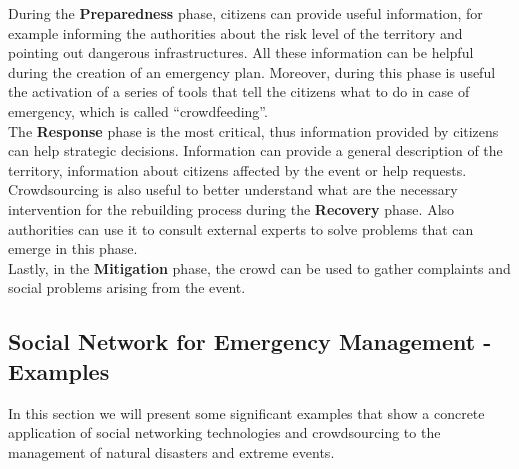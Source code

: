\noindent During the \textbf{Preparedness} phase, citizens can provide useful information, for example informing the authorities about the risk level of the territory and pointing out dangerous infrastructures. All these information can be helpful during the creation of an emergency plan. Moreover, during this phase is useful the activation of a series of tools that tell the citizens what to do in case of emergency, which is called ``crowdfeeding''.
\\
\noindent The \textbf{Response} phase is the most critical, thus information provided by citizens can help strategic decisions. Information can provide a general description of the territory, information about citizens affected by the event or help requests.
\\
\noindent Crowdsourcing is also useful to better understand what are the necessary intervention for the rebuilding process during the \textbf{Recovery} phase. Also authorities can use it to consult external experts to solve problems that can emerge in this phase.
\\
\noindent Lastly, in the \textbf{Mitigation} phase, the crowd can be used to gather complaints and social problems arising from the event.

\vspace{0.5cm}
\subsection{Social Network for Emergency Management - Examples}

\noindent In this section we will present some significant examples that show a concrete application of social networking technologies and crowdsourcing to the management of natural disasters and extreme events.

